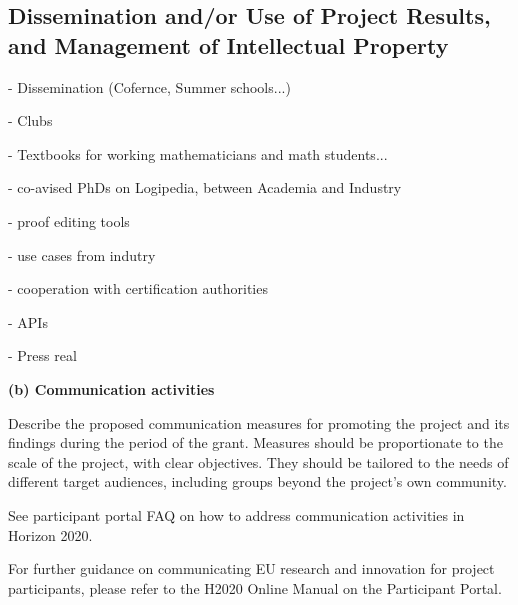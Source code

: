 \subsection{Dissemination and/or Use of Project Results, and Management of Intellectual Property}\label{sec:dissemination}


- Dissemination  (Cofernce, Summer schools...)

- Clubs

- Textbooks for working mathematicians and math students...

- co-avised PhDs on Logipedia, between Academia and Industry

- proof editing tools

- use cases from indutry

- cooperation with certification authorities

- APIs

- Press real




{\bf (b) Communication activities}

\begin{todo}{}\color{red}
  Describe the proposed communication measures for promoting the project and its findings during the period of the grant. Measures should be proportionate to the scale of the project, with clear objectives.  They should be tailored to the needs of different target audiences, including groups beyond the project's own community.

  See participant portal FAQ on how to address communication activities in Horizon 2020.

  For further guidance on communicating EU research and innovation for project participants, please refer to the H2020 Online Manual on the Participant Portal.
\end{todo}



